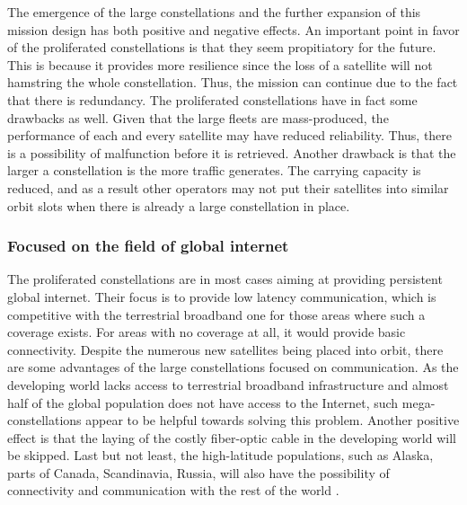 The emergence of the large constellations and the further expansion of this mission design has both positive and negative effects. An important point in favor of the proliferated constellations is that they seem propitiatory for the future. This is because it provides more resilience since the loss of a satellite will not hamstring the whole constellation. Thus, the mission can continue due to the fact that there is redundancy. The proliferated constellations have in fact some drawbacks as well. Given that the large fleets are mass-produced, the performance of each and every satellite may have reduced reliability. Thus, there is a possibility of malfunction before it is retrieved. %
Another drawback is that the larger a constellation is the more traffic generates. The carrying capacity is reduced, and as a result other operators may not put their satellites into similar orbit slots when there is already a large constellation in place. 

\bigskip
\subsubsection{Focused on the field of global internet}
\bigskip
The proliferated constellations are in most cases aiming at providing persistent global internet. Their focus is to provide low latency communication, which is competitive with the terrestrial broadband one for those areas where such a coverage exists. For areas with no coverage at all, it would provide basic connectivity. Despite the numerous new satellites being placed into orbit, there are some advantages of the large constellations focused on communication. As the developing world lacks access to terrestrial broadband infrastructure and almost half of the global population does not have access to the Internet, such mega-constellations appear to be helpful towards solving this problem. Another positive effect is that the laying of the costly fiber-optic cable in the developing world will be skipped. Last but not least, the high-latitude populations, such as Alaska, parts of Canada, Scandinavia, Russia, will also have the possibility of connectivity and communication with the rest of the world \cite{Hallex}.

\bigskip
